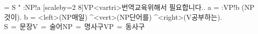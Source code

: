 \documentclass{article}	%
\begin{document}
\begin{CJK}{UTF8}{mj}
\vspace*{-3cm}
\begin{center}
\jtree 
\! = {S} "{} :{NP}!a [scaleby=2 8]{VP}<vartri>{번역교육위해서 필요합니다.}.
\!a = :{VP}!b ({NP}{것이}).
\!b = <left>({NP}{매일}) ^<vert>({NP}{단어를}) ^<right>({V}{공부하는}).
\endjtree\\[2em]
\footnotesize S\,$=$\,문장\qquad V\,$=$\,술어\qquad NP\,$=$\,명사구\qquad VP\,$=$\,동사구
\end{center}
\end{CJK}
\end{document}

